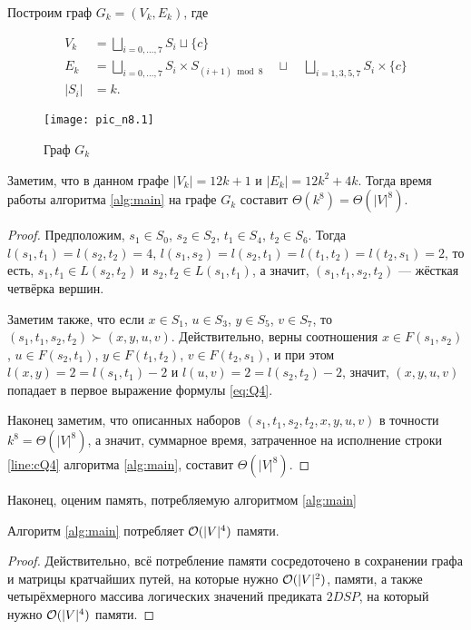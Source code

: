 \begin{theorem}
Построим граф $G_k = (V_k, E_k)$, где 

\begin{align}
V_k &= \bigsqcup\limits_{i = 0,\ldots,7} S_i \sqcup \{c\} \\
E_k &= \bigsqcup\limits_{i = 0,\ldots,7} S_i \times S_{(i+1) \bmod 8} \quad\sqcup\quad \bigsqcup\limits_{i=1,3,5,7} S_i \times \{c\} \\
|S_i| &= k.
\end{align}

\begin{figure}[H]
\caption{Граф $G_k$}
\centering
\texttt{[image: pic\_n8.1]}
\end{figure}

Заметим, что в данном графе $|V_k| = 12k + 1$ и $|E_k| = 12k^2 + 4k$. Тогда время работы алгоритма \ref{alg:main} на графе $G_k$ составит $\Theta(k^8) = \Theta(|V|^8)$.

\end{theorem}
\begin{proof}
Предположим, $s_1 \in S_0$, $s_2 \in S_2$, $t_1 \in S_4$, $t_2 \in S_6$. Тогда $l(s_1, t_1) = l(s_2, t_2) = 4$, $l(s_1, s_2) = l(s_2, t_1) = l(t_1, t_2) = l(t_2, s_1) = 2$, то есть, $s_1, t_1 \in L(s_2, t_2)$ и $s_2, t_2 \in L(s_1, t_1)$, а значит, $(s_1, t_1, s_2, t_2)$ --- жёсткая четвёрка вершин.

Заметим также, что если $x \in S_1$, $u \in S_3$, $y \in S_5$, $v \in S_7$, то $(s_1, t_1, s_2, t_2) \succ (x, y, u, v)$. Действительно, верны соотношения $x \in F(s_1, s_2)$, $u \in F(s_2, t_1)$, $y \in F(t_1, t_2)$, $v \in F(t_2, s_1)$, и при этом $l(x, y) = 2 = l(s_1, t_1) - 2$ и $l(u, v) = 2 = l(s_2, t_2) - 2$, значит, $(x, y, u, v)$ попадает в первое выражение формулы \ref{eq:Q4}.

Наконец заметим, что описанных наборов $(s_1, t_1, s_2, t_2, x, y, u, v)$ в точности $k^8 = \Theta(|V|^8)$, а значит, суммарное время, затраченное на исполнение строки \ref{line:cQ4} алгоритма \ref{alg:main}, составит $\Theta(|V|^8)$.
\end{proof}

Наконец, оценим память, потребляемую алгоритмом \ref{alg:main}
\begin{theorem}
Алгоритм \ref{alg:main} потребляет $\mathcal{O}(|V|^4)$ памяти.
\end{theorem}
\begin{proof}
Действительно, всё потребление памяти сосредоточено в сохранении графа и матрицы кратчайших путей, на которые нужно $\mathcal{O}(|V|^2)$, памяти, а также четырёхмерного массива логических значений предиката $2DSP$, на который нужно $\mathcal{O}(|V|^4)$ памяти.
\end{proof}
